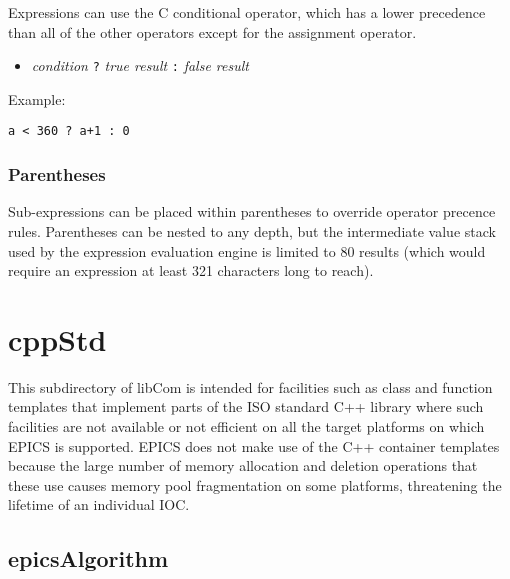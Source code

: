 Expressions can use the C conditional operator, which has a lower precedence than all of the other operators except for the 
assignment operator.

\begin{itemize}\item \emph{condition} \verb|?| \emph{true result} \verb|:| \emph{false result}

\end{itemize}Example:

\begin{verbatim}a < 360 ? a+1 : 0
\end{verbatim}\subsubsection{Parentheses}

Sub-expressions can be placed within parentheses to override operator precence rules. Parentheses can be nested to any 
depth, but the intermediate value stack used by the expression evaluation engine is limited to 80 results (which would 
require an expression at least 321 characters long to reach).

\section{cppStd}

This subdirectory of libCom is intended for facilities such as class and function templates that implement parts of the ISO 
standard C++ library where such facilities are not available or not efficient on all the target platforms on which EPICS is 
supported. EPICS does not make use of the C++ container templates because the large number of memory allocation and 
deletion operations that these use causes memory pool fragmentation on some platforms, threatening the lifetime of an 
individual IOC.

\subsection{epicsAlgorithm}


